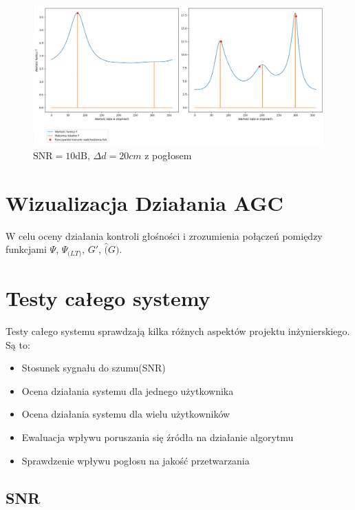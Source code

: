 \begin{figure}[h!]
    \centering
    \includegraphics[width=\textwidth]{Images/music_10db_reverb_0.2m.png}
    \caption{$\mathrm{SNR}=10\mathrm{dB}, \, \Delta d = 20cm$ z pogłosem}
    \label{fig:music_10db_20cm_reverb}
\end{figure}

\newpage

\newpage

\section{Wizualizacja Działania AGC}

W celu oceny działania kontroli głośności i zrozumienia połączeń pomiędzy funkcjami $\Psi$, $\Psi_{\mathrm(LT)}$, $G'$, $\widehat(G)$. 

\section{Testy całego systemy}

Testy całego systemu sprawdzają kilka różnych aspektów projektu inżynierskiego. Są to:

\begin{itemize}
    \item Stosunek sygnału do szumu(SNR)
    \item Ocena działania systemu dla jednego użytkownika
    \item Ocena działania systemu dla wielu użytkowników
    \item Ewaluacja wpływu poruszania się źródła na działanie algorytmu
    \item Sprawdzenie wpływu pogłosu na jakość przetwarzania
    
\end{itemize}
\subsection{SNR}

